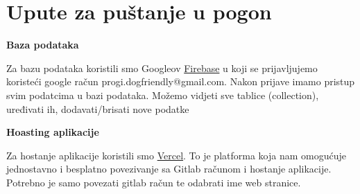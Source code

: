 			\eject 
		
		\section{Upute za puštanje u pogon}
		

   \textbf{Baza podataka}

    Za bazu podataka koristili smo Googleov \href{https://firebase.google.com/}{Firebase} u koji se prijavljujemo koristeći google račun progi.dogfriendly@gmail.com. Nakon prijave imamo pristup svim podatcima u bazi podataka. Možemo vidjeti sve tablice (collection), uređivati ih, dodavati/brisati nove podatke

    \textbf{Hoasting aplikacije}
    
    Za hostanje aplikacije koristili smo \href{https://vercel.com/}{Vercel}. To je platforma koja nam omogućuje jednostavno i besplatno povezivanje sa Gitlab računom i hostanje aplikacije. Potrebno je samo povezati gitlab račun te odabrati ime web stranice. 
			
			
			\eject 
